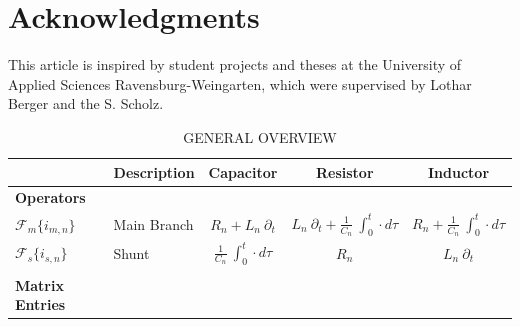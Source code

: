 \documentclass[a4paper, 10pt, twoside, twocolumn]{scrartcl}
\begin{document}






	 

\section*{Acknowledgments}	
This article is inspired by student projects and theses at the University of Applied Sciences Ravensburg-Weingarten, which were supervised by Lothar Berger and the S. Scholz.

\begin{table}[t]
	\renewcommand{\arraystretch}{1.3}
	\centering
	\caption{\MakeUppercase{General Overview}}
	\begin{tabular}{l | l c c c}
		\toprule
		 & Description & Capacitor  & Resistor & Inductor\\
		\midrule
		\textbf{Operators} & & & & \\
		$\mathcal{F}_{m}\{i_{m,n}\}$ & Main Branch & $R_{n} + L_{n} ~ \partial_t $ & $ L_n ~ \partial_{t}  + \frac{1}{C_{n}} ~ \int_{0}^{t} \cdot d\tau$ & $R_n  + \frac{1}{C_{n}} ~ \int_{0}^{t} \cdot d\tau$ \\
		$\mathcal{F}_{s}\{i_{s,n}\}$ & Shunt & $\frac{1}{C_{n}} ~ \int_{0}^{t} \cdot d\tau$ & $R_{n}$ & $L_{n} ~ \partial_t$ \\
		 & & & & \\
		\textbf{Matrix Entries} & & & & \\
		\bottomrule
	\end{tabular}
	\label{table:general_overview}
\end{table}
\end{document}
